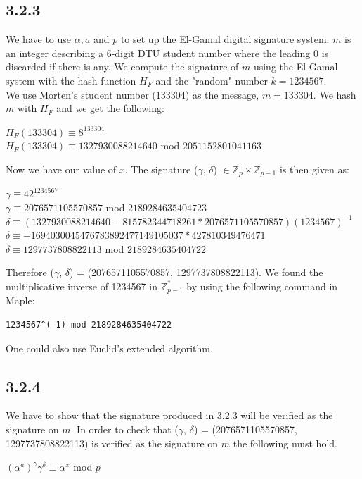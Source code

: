 \documentclass[11pt]{report}
\begin{document}
\subsection*{3.2.3}
We have to use $\alpha, a$ and $p$ to set up the El-Gamal digital signature system. $m$ is an integer describing a 6-digit DTU student number where the leading 0 is discarded if there is any. We compute the signature of $m$ using the El-Gamal system with the hash function $H_F$ and the "random" number $k = 1234567$.\\
We use Morten's student number (133304) as the message, $m = 133304$. We hash $m$ with $H_F$ and we get the following:
\begin{center}
$H_F(133304) \equiv 8^{133304}$\\
$H_F(133304) \equiv 1327930088214640$ mod $2051152801041163$
\end{center}
Now we have our value of $x$. The signature ($\gamma$, $\delta$) $\in \mathbb{Z}_{p} \times \mathbb{Z}_{p-1}$ is then given as:
\begin{center}
$\gamma \equiv 42^{1234567}$\\
$\gamma \equiv 2076571105570857$ mod $2189284635404723$\\
$\delta \equiv (1327930088214640 - 815782344718261 * 2076571105570857)(1234567)^{-1}$\\
$\delta \equiv -1694030045476783892477149105037 * 427810349476471$\\
$\delta \equiv 1297737808822113$ mod $2189284635404722$
\end{center}
Therefore ($\gamma$, $\delta$) = (2076571105570857, 1297737808822113). We found the multiplicative inverse of 1234567 in $\mathbb{Z}^*_{p-1}$ by using the following command in Maple:
\begin{lstlisting}[style=Maple]
1234567^(-1) mod 2189284635404722
\end{lstlisting}
One could also use Euclid's extended algorithm.

\subsection*{3.2.4}
We have to show that the signature produced in 3.2.3 will be verified as the signature on $m$. In order to check that ($\gamma$, $\delta$) = (2076571105570857, 1297737808822113) is verified as the signature on $m$ the following must hold.
\begin{center}
$(\alpha^a)^\gamma \gamma^\delta \equiv \alpha^x$ mod $p$
\end{center}
\end{document}
